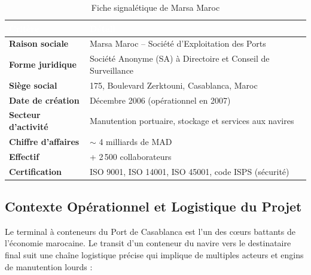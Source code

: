 \documentclass[12pt,a4paper]{article}
\begin{document}
\begin{table}[H]
\centering
\caption{Fiche signalétique de Marsa Maroc}
\begin{tabular}{|l|p{10cm}|}
\hline
\rowcolor{TableHeader}\textcolor{white}{\textbf{Critère}} & \textcolor{white}{\textbf{Détail}} \\ \hline
\textbf{Raison sociale} & Marsa Maroc -- Société d'Exploitation des Ports \\ \hline
\textbf{Forme juridique} & Société Anonyme (SA) à Directoire et Conseil de Surveillance \\ \hline
\textbf{Siège social} & 175, Boulevard Zerktouni, Casablanca, Maroc \\ \hline
\textbf{Date de création} & Décembre 2006 (opérationnel en 2007) \\ \hline
\textbf{Secteur d'activité} & Manutention portuaire, stockage et services aux navires \\ \hline
\textbf{Chiffre d'affaires} & $\sim$ 4 milliards de MAD \\ \hline
\textbf{Effectif} & + 2\,500 collaborateurs \\ \hline
\textbf{Certification} & ISO 9001, ISO 14001, ISO 45001, code ISPS (sécurité) \\ \hline
\end{tabular}
\label{tab:fiche_marsa}
\end{table}

\subsection{Contexte Opérationnel et Logistique du Projet}

Le terminal à conteneurs du Port de Casablanca est l'un des cœurs battants de l'économie marocaine. Le transit d'un conteneur du navire vers le destinataire final suit une chaîne logistique précise qui implique de multiples acteurs et engins de manutention lourds :
\end{document}
